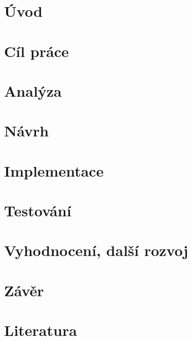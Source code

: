 \chapter*{Úvod}

\chapter{Cíl práce}

\setcounter{page}{1}


\chapter{Analýza}



\chapter{Návrh}


\chapter{Implementace}


\chapter{Testování}


\chapter{Vyhodnocení, další rozvoj}


\chapter*{Závěr}
\chapter*{Literatura}
